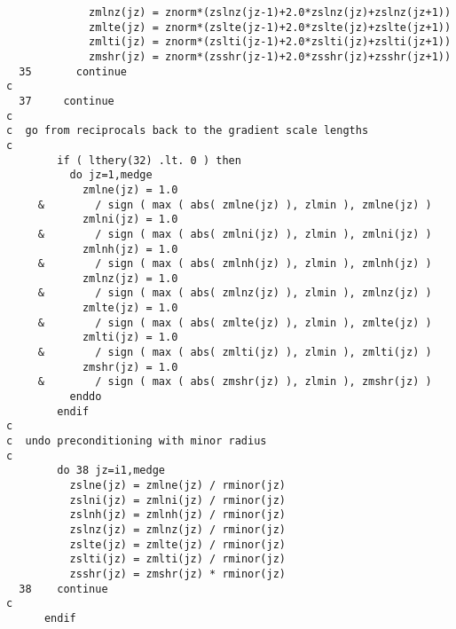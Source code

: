\begin{verbatim}
             zmlnz(jz) = znorm*(zslnz(jz-1)+2.0*zslnz(jz)+zslnz(jz+1))
             zmlte(jz) = znorm*(zslte(jz-1)+2.0*zslte(jz)+zslte(jz+1))
             zmlti(jz) = znorm*(zslti(jz-1)+2.0*zslti(jz)+zslti(jz+1))
             zmshr(jz) = znorm*(zsshr(jz-1)+2.0*zsshr(jz)+zsshr(jz+1))
  35       continue
c
  37     continue
c
c  go from reciprocals back to the gradient scale lengths
c
        if ( lthery(32) .lt. 0 ) then
          do jz=1,medge
            zmlne(jz) = 1.0 
     &        / sign ( max ( abs( zmlne(jz) ), zlmin ), zmlne(jz) )
            zmlni(jz) = 1.0 
     &        / sign ( max ( abs( zmlni(jz) ), zlmin ), zmlni(jz) )
            zmlnh(jz) = 1.0 
     &        / sign ( max ( abs( zmlnh(jz) ), zlmin ), zmlnh(jz) )
            zmlnz(jz) = 1.0 
     &        / sign ( max ( abs( zmlnz(jz) ), zlmin ), zmlnz(jz) )
            zmlte(jz) = 1.0 
     &        / sign ( max ( abs( zmlte(jz) ), zlmin ), zmlte(jz) )
            zmlti(jz) = 1.0 
     &        / sign ( max ( abs( zmlti(jz) ), zlmin ), zmlti(jz) )
            zmshr(jz) = 1.0 
     &        / sign ( max ( abs( zmshr(jz) ), zlmin ), zmshr(jz) )
          enddo
        endif
c
c  undo preconditioning with minor radius
c
        do 38 jz=i1,medge
          zslne(jz) = zmlne(jz) / rminor(jz)
          zslni(jz) = zmlni(jz) / rminor(jz)
          zslnh(jz) = zmlnh(jz) / rminor(jz)
          zslnz(jz) = zmlnz(jz) / rminor(jz)
          zslte(jz) = zmlte(jz) / rminor(jz)
          zslti(jz) = zmlti(jz) / rminor(jz)
          zsshr(jz) = zmshr(jz) * rminor(jz)
  38    continue
c
      endif
\end{verbatim}

